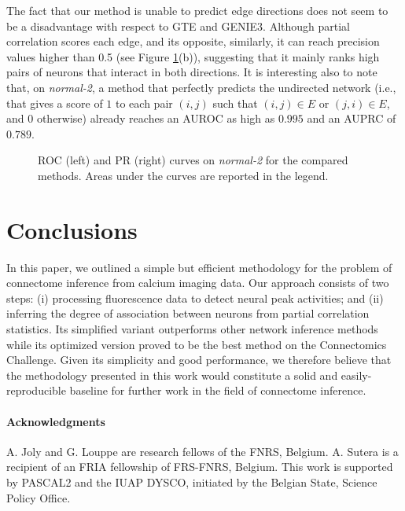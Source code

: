 \documentclass[wcp]{jmlr}
\begin{document}
The fact that our method is unable to predict edge directions does not seem to
be a disadvantage with respect to GTE and GENIE3. Although partial correlation
scores each edge, and its opposite, similarly, it can reach precision values
higher than 0.5 (see Figure \ref{fig:curves}(b)), suggesting that it mainly ranks high
pairs of neurons that interact in both directions.  It is interesting also to
note that, on \textit{normal-2}, a method that perfectly predicts the
undirected network (i.e., that gives a score of $1$ to each pair $(i,j)$ such that
$(i,j)\in E$ or $(j,i)\in E$, and $0$ otherwise) already reaches an AUROC as high
as $0.995$ and an AUPRC of $0.789$.

\begin{figure}[t]
\centering
{}
\caption{ROC (left) and PR (right) curves on \textit{normal-2} for the compared methods. Areas under the curves are reported in the legend.}
\label{fig:curves}
\end{figure}

\section{Conclusions} \label{sec:conclusion}

In this paper, we outlined a simple but efficient methodology for the problem
of connectome inference from calcium imaging data. Our approach consists of two
steps: (i) processing fluorescence data to detect neural peak activities; and
(ii) inferring the degree of association between neurons from partial
correlation statistics. Its simplified variant outperforms other
network inference methods while its optimized version proved to be the best method
on the Connectomics Challenge. Given its simplicity and good performance, we
therefore believe that the methodology presented in this work
would constitute a solid and easily-reproducible baseline for further work in
the field of connectome inference.

\paragraph{Acknowledgments}
A. Joly and G. Louppe are research fellows of the FNRS, Belgium.  A. Sutera is a
recipient of an FRIA fellowship of FRS-FNRS, Belgium. This work is supported by
PASCAL2 and the IUAP DYSCO, initiated by the Belgian State, Science Policy
Office.
\end{document}
